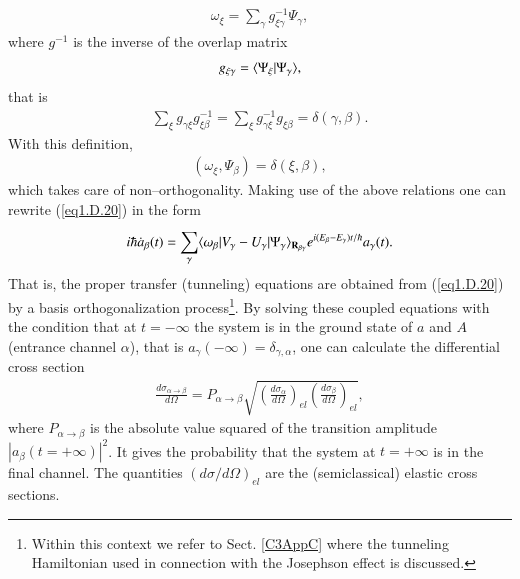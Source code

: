 \begin{subappendices}
\begin{align}
\omega_\xi=\sum_{\gamma}g^{-1}_{\xi\gamma}\Psi_\gamma,
\end{align}
where $g^{-1}$ is the inverse of the overlap matrix
\begin{align}\label{eq1.D.23}
g_{\xi\gamma}=\langle {\Psi_\xi|\Psi_\gamma} \rangle,
\end{align}
that is
\begin{align}\label{eq1.D.24}
\sum_{\xi}g_{\gamma\xi}g^{-1}_{\xi\beta}=\sum_{\xi}^{}g^{-1}_{\gamma\xi}g_{\xi\beta}=\delta(\gamma,\beta).
\end{align}
With this definition,
\begin{align}\label{eq1.D.25}
(\omega_\xi,\Psi_\beta)=\delta(\xi,\beta),
\end{align}
which takes care of non--orthogonality. Making use of the above relations one can rewrite (\ref{eq1.D.20}) in the form
\begin{align}\label{eq1.D.26}
i\hbar \dot a_\beta(t)=\sum_{\gamma}^{}\langle {\omega_\beta|V_\gamma-U_\gamma|\Psi_\gamma} \rangle_{\mathbf R_{\beta\gamma}}e^{i(E_\beta-E_\gamma)t/\hbar}a_\gamma(t).
\end{align}
That is, the proper transfer (tunneling) equations are obtained from (\ref{eq1.D.20}) by a basis orthogonalization process\footnote{Within this context we refer to Sect. \ref{C3AppC} where the tunneling Hamiltonian used in connection with the Josephson effect is discussed.}. 
 By solving these coupled equations with the condition that at $t=-\infty$ the system is in the ground state of $a$ and $A$ (entrance channel $\alpha$), that is $a_\gamma(-\infty)=\delta_{\gamma,\alpha}$, one can calculate the differential cross section
 \begin{align}\label{eq1.D.27}
 \frac{d\sigma_{\alpha\rightarrow\beta}}{d\Omega}=P_{\alpha\rightarrow\beta}\sqrt{\left(\frac{d\sigma_\alpha}{d\Omega}\right)_{el}\left(\frac{d\sigma_\beta}{d\Omega}\right)_{el}},
 \end{align}
 where $P_{\alpha\rightarrow\beta}$ is the absolute value squared of the transition amplitude $|a_{\beta}(t=+\infty)|^2$. It gives the probability that the system at $t=+\infty$ is in the final channel. The quantities $(d\sigma/d\Omega)_{el}$ are the (semiclassical) elastic cross sections. 
 

\end{subappendices}
